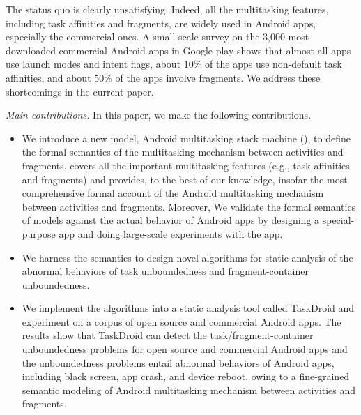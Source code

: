 The status quo is clearly unsatisfying. 
Indeed, all the multitasking features, including task affinities and fragments, are widely used in Android apps, especially the commercial ones. A small-scale survey on the 3,000 most downloaded commercial Android apps in Google play shows that almost all apps use launch modes and intent flags, about $10\%$ of the apps use non-default task affinities, and  about $50\%$ of the apps involve fragments. 
We address these shortcomings in the current paper. %
%

\medskip
\noindent\emph{Main contributions.} In this paper, we make the following contributions. %
\begin{itemize}
\item We introduce a new model, Android multitasking stack machine (\AMASS), to define the formal semantics of the multitasking mechanism between activities and fragments. {\AMASS} covers all the important multitasking features (e.g., task affinities and fragments) and provides, to the best of our knowledge, insofar the most comprehensive formal account of the Android multitasking mechanism between activities and fragments. Moreover, We validate the formal semantics of {\AMASS} models against the actual behavior of  Android apps by designing a special-purpose app and doing large-scale experiments with the app. 
%
\item We harness the semantics to design novel algorithms for static analysis of the abnormal behaviors of task unboundedness and fragment-container unboundedness. %

\item We implement the algorithms into a static analysis tool called TaskDroid and experiment on a corpus of open source and commercial Android apps.  
The results show that TaskDroid can detect the task/fragment-container unboundedness problems for open source and commercial Android apps and the unboundedness problems entail abnormal behaviors of Android apps, including black screen, app crash, and device reboot, owing to a fine-grained semantic modeling of Android multitasking mechanism between activities and fragments.  %
\end{itemize}

